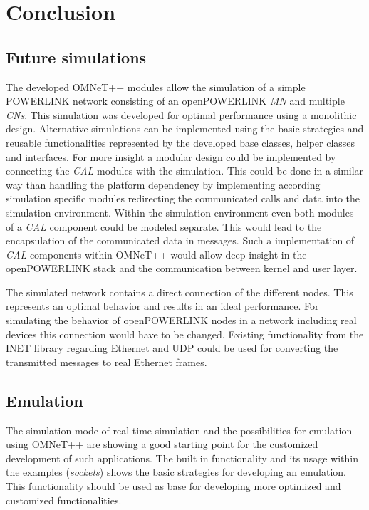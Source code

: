 \chapter{Conclusion}
\label{cha:conclusion}

\section{Future simulations}
\label{sec:conclusion_futuresim}
\begin{sloppypar}
The developed OMNeT++ modules allow the simulation of a simple \mbox{POWERLINK} network consisting of an openPOWERLINK \emph{MN} and multiple \emph{CNs}.
This simulation was developed for optimal performance using a monolithic design.
Alternative simulations can be implemented using the basic strategies and reusable functionalities represented by the developed base classes, helper classes and interfaces.
For more insight a modular design could be implemented by connecting the \emph{CAL} modules with the simulation.
This could be done in a similar way than handling the platform dependency by implementing according simulation specific modules redirecting the communicated calls and data into the simulation environment.
Within the simulation environment even both modules of a \emph{CAL} component could be modeled separate.
This would lead to the encapsulation of the communicated data in messages.
Such a implementation of \emph{CAL} components within OMNeT++ would allow deep insight in the openPOWERLINK stack and the communication between kernel and user layer.
\end{sloppypar}

The simulated network contains a direct connection of the different nodes.
This represents an optimal behavior and results in an ideal performance.
For simulating the behavior of openPOWERLINK nodes in a network including real devices this connection would have to be changed.
Existing functionality from the INET library regarding Ethernet and UDP could be used for converting the transmitted messages to real Ethernet frames.

\section{Emulation}
\label{sec:conclusion_emulation}
The simulation mode of real-time simulation and the possibilities for emulation using OMNeT++ are showing a good starting point for the customized development of such applications.
The built in functionality and its usage within the examples (\emph{sockets}) shows the basic strategies for developing an emulation.
This functionality should be used as base for developing more optimized and customized functionalities.

